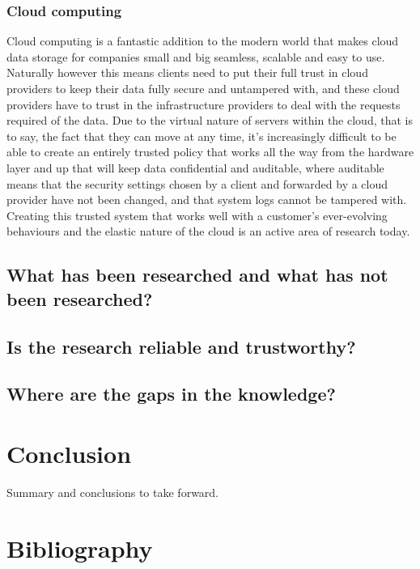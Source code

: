 \documentclass[a4paper, 11pt]{article}
\begin{document}
\subsubsection{Cloud computing}
Cloud computing is a fantastic addition to the modern world that makes cloud data storage for companies small and big seamless, scalable and easy to use. \cite{ref:jang2014survey} Naturally however this means clients need to put their full trust in cloud providers to keep their data fully secure and untampered \cite{ref:zhang2010cloud} with, and these cloud providers have to trust in the infrastructure providers to deal with the requests required of the data. Due to the virtual nature of servers within the cloud, that is to say, the fact that they can move at any time, it's increasingly difficult to be able to create an entirely trusted policy that works all the way from the hardware layer and up that will keep data confidential and auditable, where auditable means that the security settings chosen by a client and forwarded by a cloud provider have not been changed, and that system logs cannot be tampered with. \cite{ref:zhang2010cloud} Creating this trusted system that works well with a customer's ever-evolving behaviours and the elastic nature of the cloud is an active area of research today.

\subsection{What has been researched and what has not been researched?}


\subsection{Is the research reliable and trustworthy?}


\subsection{Where are the gaps in the knowledge?}

\section{Conclusion}
Summary and conclusions to take forward.

\section{Bibliography}


\end{document}
